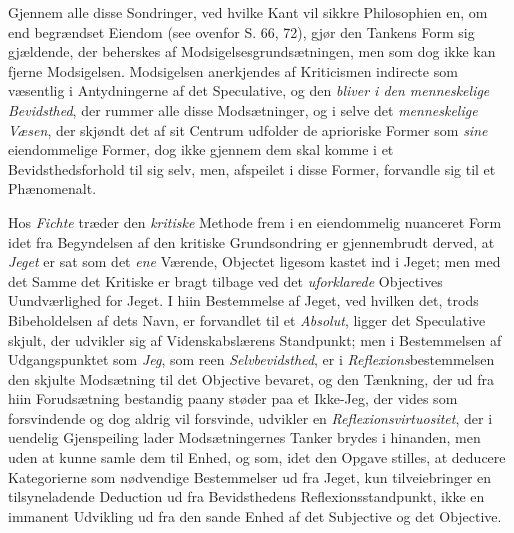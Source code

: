Gjennem alle disse Sondringer, ved hvilke Kant vil sikkre
Philosophien en, om end begrændset Eiendom (see ovenfor S.
66, 72), gjør den Tankens Form sig gjældende, der beherskes
af Modsigelsesgrundsætningen, men som dog ikke kan fjerne
Modsigelsen. Modsigelsen anerkjendes af Kriticismen indirecte
som væsentlig i Antydningerne af det Speculative, og den
\emph{bliver i den menneskelige Bevidsthed}, der rummer alle
disse Modsætninger, og i selve det \emph{menneskelige Væsen},
der skjøndt det af sit Centrum udfolder de aprioriske Former
 som \emph{sine} eiendommelige Former, dog ikke gjennem dem skal
komme i et Bevidsthedsforhold til sig selv, men, afspeilet i
disse Former, forvandle sig til et Phænomenalt.

Hos \emph{Fichte} træder den \emph{kritiske} Methode frem i en
eiendommelig nuanceret Form idet fra Begyndelsen af den kritiske
Grundsondring er gjennembrudt derved, at \emph{Jeget} er sat
som det \emph{ene} Værende, Objectet ligesom kastet ind i Jeget;
men med det Samme det Kritiske er bragt tilbage ved det
\emph{uforklarede} Objectives Uundværlighed for Jeget. I hiin Bestemmelse
af Jeget, ved hvilken det, trods Bibeholdelsen af
dets Navn, er forvandlet til et \emph{Absolut}, ligger det Speculative
skjult, der udvikler sig af Videnskabslærens Standpunkt;
men i Bestemmelsen af Udgangspunktet som \emph{Jeg}, som reen
\emph{Selvbevidsthed}, er i \emph{Reflexions}bestemmelsen den skjulte
Modsætning til det Objective bevaret, og den Tænkning, der ud
fra hiin Forudsætning bestandig paany støder paa et Ikke-Jeg,
der vides som forsvindende og dog aldrig vil forsvinde, udvikler
en \emph{Reflexionsvirtuositet}, der i uendelig Gjenspeiling
lader Modsætningernes Tanker brydes i hinanden, men
uden at kunne samle dem til Enhed, og som, idet den Opgave
stilles, at deducere Kategorierne som nødvendige Bestemmelser
ud fra Jeget, kun tilveiebringer en tilsyneladende Deduction
ud fra Bevidsthedens Reflexionsstandpunkt, ikke en
immanent Udvikling ud fra den sande Enhed af det Subjective
og det Objective.

